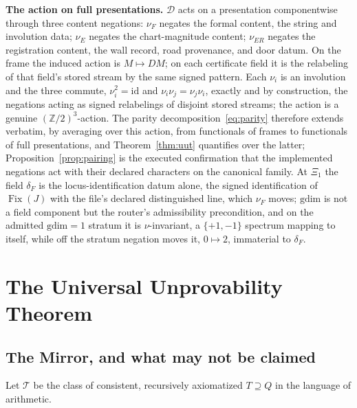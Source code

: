 \documentclass[twocolumn,10pt]{article}
\theoremstyle{plain}
\theoremstyle{definition}
\begin{document}
\medskip\noindent\textbf{The action on full presentations.} $\mathcal D$ acts on a presentation componentwise through three content negations: $\nu_F$ negates the formal content, the string and involution data; $\nu_E$ negates the chart-magnitude content; $\nu_{ER}$ negates the registration content, the wall record, road provenance, and door datum. On the frame the induced action is $M\mapsto DM$; on each certificate field it is the relabeling of that field's stored stream by the same signed pattern. Each $\nu_i$ is an involution and the three commute, $\nu_i^2=\mathrm{id}$ and $\nu_i\nu_j=\nu_j\nu_i$, exactly and by construction, the negations acting as signed relabelings of disjoint stored streams; the action is a genuine $(\mathbb Z/2)^3$-action. The parity decomposition~\eqref{eq:parity} therefore extends verbatim, by averaging over this action, from functionals of frames to functionals of full presentations, and Theorem~\ref{thm:uut} quantifies over the latter; Proposition~\ref{prop:pairing} is the executed confirmation that the implemented negations act with their declared characters on the canonical family. At $\Xi_1$ the field $\delta_F$ is the locus-identification datum alone, the signed identification of $\operatorname{Fix}(J)$ with the file's declared distinguished line, which $\nu_F$ moves; $\mathrm{gdim}$ is not a field component but the router's admissibility precondition, and on the admitted $\mathrm{gdim}=1$ stratum it is $\nu$-invariant, a $\{+1,-1\}$ spectrum mapping to itself, while off the stratum negation moves it, $0\mapsto2$, immaterial to $\delta_F$.

\section{The Universal Unprovability Theorem}\label{sec:uut}

\subsection{The Mirror, and what may not be claimed}
Let $\mathcal T$ be the class of consistent, recursively axiomatized $T\supseteq Q$ in the language of arithmetic.
\end{document}
